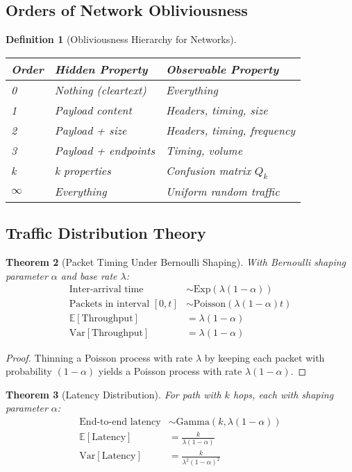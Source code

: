 \documentclass[11pt,final]{article}
\newcommand{\Expect}{\mathbb{E}}
\newcommand{\Var}{\text{Var}}
\newcommand{\Poisson}{\text{Poisson}}
\newcommand{\Expo}{\text{Exp}}
\newtheorem{theorem}{Theorem}[section]
\newtheorem{definition}[theorem]{Definition}
\begin{document}
\subsection{Orders of Network Obliviousness}

\begin{definition}[Obliviousness Hierarchy for Networks]
\begin{center}
\begin{tabular}{lll}
\toprule
\textbf{Order} & \textbf{Hidden Property} & \textbf{Observable Property} \\
\midrule
0 & Nothing (cleartext) & Everything \\
1 & Payload content & Headers, timing, size \\
2 & Payload + size & Headers, timing, frequency \\
3 & Payload + endpoints & Timing, volume \\
k & k properties & Confusion matrix $Q_k$ \\
$\infty$ & Everything & Uniform random traffic \\
\bottomrule
\end{tabular}
\end{center}
\end{definition}

\subsection{Traffic Distribution Theory}

\begin{theorem}[Packet Timing Under Bernoulli Shaping]
With Bernoulli shaping parameter $\alpha$ and base rate $\lambda$:
\begin{align}
\text{Inter-arrival time} &\sim \Expo(\lambda(1-\alpha)) \\
\text{Packets in interval } [0,t] &\sim \Poisson(\lambda(1-\alpha)t) \\
\Expect[\text{Throughput}] &= \lambda(1-\alpha) \\
\Var[\text{Throughput}] &= \lambda(1-\alpha)
\end{align}
\end{theorem}

\begin{proof}
Thinning a Poisson process with rate $\lambda$ by keeping each packet with probability $(1-\alpha)$ yields a Poisson process with rate $\lambda(1-\alpha)$.
\end{proof}

\begin{theorem}[Latency Distribution]
For path with $k$ hops, each with shaping parameter $\alpha$:
\begin{align}
\text{End-to-end latency} &\sim \text{Gamma}(k, \lambda(1-\alpha)) \\
\Expect[\text{Latency}] &= \frac{k}{\lambda(1-\alpha)} \\
\Var[\text{Latency}] &= \frac{k}{\lambda^2(1-\alpha)^2}
\end{align}
\end{theorem}
\end{document}
